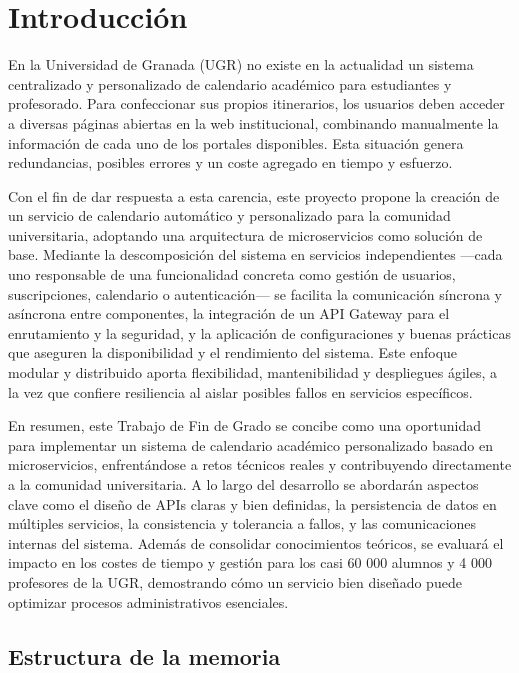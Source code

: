 \chapter{Introducción}\label{cap:introduccion}

En la Universidad de Granada (UGR) no existe en la actualidad un sistema centralizado y personalizado de calendario académico para estudiantes y profesorado. Para confeccionar sus propios itinerarios, los usuarios deben acceder a diversas páginas abiertas en la web institucional, combinando manualmente la información de cada uno de los portales disponibles. Esta situación genera redundancias, posibles errores y un coste agregado en tiempo y esfuerzo.

Con el fin de dar respuesta a esta carencia, este proyecto propone la creación de un servicio de calendario automático y personalizado para la comunidad universitaria, adoptando una arquitectura de microservicios como solución de base. Mediante la descomposición del sistema en servicios independientes —cada uno responsable de una funcionalidad concreta como gestión de usuarios, suscripciones, calendario o autenticación— se facilita la comunicación síncrona y asíncrona entre componentes, la integración de un API Gateway para el enrutamiento y la seguridad, y la aplicación de configuraciones y buenas prácticas que aseguren la disponibilidad y el rendimiento del sistema. Este enfoque modular y distribuido aporta flexibilidad, mantenibilidad y despliegues ágiles, a la vez que confiere resiliencia al aislar posibles fallos en servicios específicos.

En resumen, este Trabajo de Fin de Grado se concibe como una oportunidad para implementar un sistema de calendario académico personalizado basado en microservicios, enfrentándose a retos técnicos reales y contribuyendo directamente a la comunidad universitaria. A lo largo del desarrollo se abordarán aspectos clave como el diseño de APIs claras y bien definidas, la persistencia de datos en múltiples servicios, la consistencia y tolerancia a fallos, y las comunicaciones internas del sistema. Además de consolidar conocimientos teóricos, se evaluará el impacto en los costes de tiempo y gestión para los casi 60 000 alumnos y 4 000 profesores de la UGR, demostrando cómo un servicio bien diseñado puede optimizar procesos administrativos esenciales.

\section{Estructura de la memoria}

